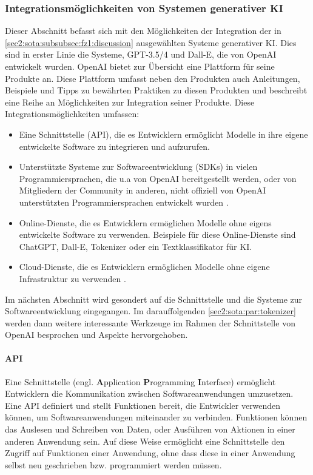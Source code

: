 \subsubsection{Integrationsmöglichkeiten von Systemen generativer KI}
\label{sec2:sota:subsubsec:genai-capabilities-integration}
Dieser Abschnitt befasst sich mit den Möglichkeiten der Integration der in \cref{sec2:sota:subsubsec:fz1:discussion} ausgewählten Systeme generativer KI.
Dies sind in erster Linie die Systeme, GPT-3.5/4 und Dall-E, die von OpenAI entwickelt wurden.
OpenAI bietet zur Übersicht eine Plattform für seine Produkte an.
Diese Plattform umfasst neben den Produkten auch Anleitungen, Beispiele und Tipps zu bewährten Praktiken zu diesen Produkten und beschreibt eine Reihe an Möglichkeiten zur Integration seiner Produkte.
Diese Integrationsmöglichkeiten umfassen:
\begin{itemize}
    \item Eine Schnittstelle (API), die es Entwicklern ermöglicht Modelle in ihre eigene entwickelte Software zu integrieren und aufzurufen.
    \item Unterstützte Systeme zur Softwareentwicklung (SDKs) in vielen Programmiersprachen, die u.a von OpenAI bereitgestellt werden, oder von Mitgliedern der Community in anderen, nicht offiziell von OpenAI unterstützten Programmiersprachen entwickelt wurden \cite{openai-community-library}.
    \item Online-Dienste, die es Entwicklern ermöglichen Modelle ohne eigens entwickelte Software zu verwenden.
    Beispiele für diese Online-Dienste sind ChatGPT, Dall-E, Tokenizer oder ein Textklassifikator für KI.
    \item Cloud-Dienste, die es Entwicklern ermöglichen Modelle ohne eigene Infrastruktur zu verwenden \cite{openai-cloud-services}.
\end{itemize}
Im nächsten Abschnitt wird gesondert auf die Schnittstelle und die Systeme zur Softwareentwicklung eingegangen.
Im darauffolgenden \cref{sec2:sota:par:tokenizer} werden dann weitere interessante Werkzeuge im Rahmen der Schnittstelle von OpenAI besprochen und Aspekte hervorgehoben.

\paragraph{API}
\label{sec2:sota:par:api}
Eine Schnittstelle (engl. \textbf{A}pplication \textbf{P}rogramming \textbf{I}nterface) ermöglicht Entwicklern die Kommunikation zwischen Softwareanwendungen umzusetzen.
Eine API definiert und stellt Funktionen bereit, die Entwickler verwenden können, um Softwareanwendungen miteinander zu verbinden.
Funktionen können das Auslesen und Schreiben von Daten, oder Ausführen von Aktionen in einer anderen Anwendung sein.
Auf diese Weise ermöglicht eine Schnittstelle den Zugriff auf Funktionen einer Anwendung, ohne dass diese in einer Anwendung selbst neu geschrieben bzw. programmiert werden müssen.

